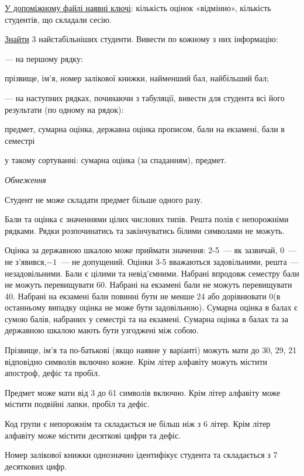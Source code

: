\documentclass[11pt, ukrainian]{article}
\begin{document}
\underline{У допоміжному файлі наявні ключі}: кількість оцінок «відмінно», кількість студентів, що складали сесію.

\underline{Знайти} 3 найстабільніших студенти. Вивести по кожному з них інформацію:\par
{\noindent}--- на першому рядку:\par
прізвище, ім’я, номер залікової книжки, найменший бал, найбільший бал;

{\noindent}--- на наступних рядках, починаючи з табуляції, вивести для студента всі його результати (по одному на рядок):\par
предмет, сумарна оцінка, державна оцінка прописом, бали на екзамені, бали в семестрі

{\noindent}у такому сортуванні: сумарна оцінка (за спаданням), предмет.


\bigskip\textit{Обмеження}

Студент не може складати предмет більше одного разу.

Бали та оцінка є значеннями цілих числових типів. Решта полів є непорожніми рядками.
Рядки розпочинатись та закінчуватись білими символами не можуть.

Оцінка за державною шкалою може приймати значення: 2-5~--- як зазвичай, 0~--- не з’явився,$-1$~--- не допущений. 
Оцінки 3-5 вважаються задовільними, решта~--- незадовільними. 
Бали є цілими та невід’ємними.
Набрані впродовж семестру бали не можуть перевищувати 60. 
Набрані на екзамені бали не можуть перевищувати 40. 
Набрані на екзамені бали повинні бути не менше 24 або дорівнювати 0(в останньому випадку оцінка не може бути задовільною). 
Сумарна оцінка в балах є сумою балів, набраних у семестрі та на екзамені.
Сумарна оцінка в балах та за державною шкалою мають бути узгоджені між собою.

Прізвище, ім’я та по-батькові (якщо наявне у варіанті) можуть мати до 30, 29, 21 відповідно символів включно кожне. 
Крім літер алфавіту можуть містити апостроф, дефіс та пробіл.

Предмет може мати від 3 до 61 символів включно. 
Крім літер алфавіту може містити подвійні лапки, пробіл та дефіс.

Код групи є непорожнім та складається не більш ніж з 6 літер. 
Крім літер алфавіту може містити десяткові цифри та дефіс.


Номер залікової книжки однозначно ідентифікує студента та складається з 7 десяткових цифр. 
\end{document}

